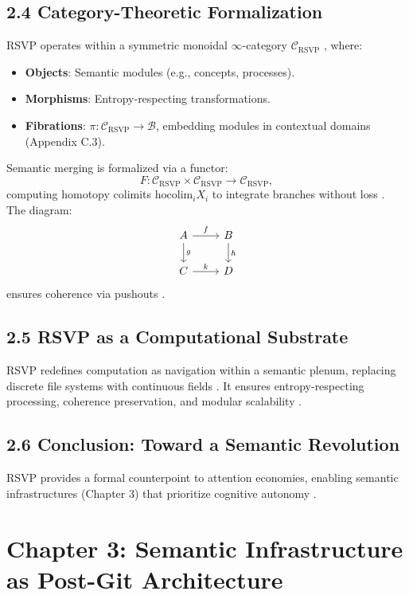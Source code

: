 \documentclass[12pt]{article}
\begin{document}
\subsection{2.4 Category-Theoretic Formalization}

RSVP operates within a symmetric monoidal \(\infty\)-category \(\mathcal{C}_{\text{RSVP}}\) \citep{maclane1998}, where:
\begin{itemize}
    \item \textbf{Objects}: Semantic modules (e.g., concepts, processes).
    \item \textbf{Morphisms}: Entropy-respecting transformations.
    \item \textbf{Fibrations}: \(\pi: \mathcal{C}_{\text{RSVP}} \to \mathcal{B}\), embedding modules in contextual domains (Appendix C.3).
\end{itemize}

Semantic merging is formalized via a functor:
\[
F: \mathcal{C}_{\text{RSVP}} \times \mathcal{C}_{\text{RSVP}} \to \mathcal{C}_{\text{RSVP}},
\]
computing homotopy colimits \(\text{hocolim}_i X_i\) to integrate branches without loss \citep{hatcher2002}. The diagram:
\[
\begin{tikzcd}
A \arrow[r, "f"] \arrow[d, "g"] & B \arrow[d, "h"] \\
C \arrow[r, "k"] & D
\end{tikzcd}
\]
ensures coherence via pushouts \citep{lawvere2009}.

\subsection{2.5 RSVP as a Computational Substrate}

RSVP redefines computation as navigation within a semantic plenum, replacing discrete file systems with continuous fields \citep{bird1988}. It ensures entropy-respecting processing, coherence preservation, and modular scalability \citep{milewski2018}.

\subsection{2.6 Conclusion: Toward a Semantic Revolution}

RSVP provides a formal counterpoint to attention economies, enabling semantic infrastructures (Chapter 3) that prioritize cognitive autonomy \citep{whitehead1978}.

\section{Chapter 3: Semantic Infrastructure as Post-Git Architecture}
\end{document}

